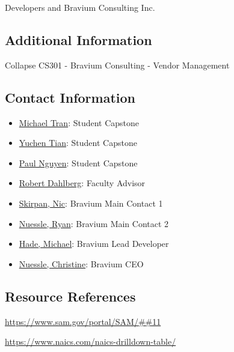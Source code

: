 \documentclass[10pt]{article}
\begin{document}
Developers and Bravium Consulting Inc.

\subsection{Additional Information}

Collapse CS301 - Bravium Consulting - Vendor Management

\subsection{Contact Information}

\begin{itemize}
	\item\href{tranml3@mymail.vcu.edu}{Michael Tran}: Student Capstone 
	\item\href{tiany4@mymail.vcu.edu}{Yuchen Tian}: Student Capstone 
	\item\href{nguyenp22@mymail.vcu.edu}{Paul Nguyen}: Student Capstone 
	\item\href{dahlbergra@mymail.vcu.edu}{Robert Dahlberg}: Faculty Advisor
	\item\href{nskirpan@braviumconsulting.com}{Skirpan, Nic}: Bravium Main Contact 1
	\item\href{rnuessle@braviumconsulting.com}{Nuessle, Ryan}: Bravium Main Contact 2
	\item\href{mhade@braviumconsulting.com}{Hade, Michael}: Bravium Lead Developer
	\item\href{cnuessle@braviumconsulting.com}{Nuessle, Christine}: Bravium CEO

\end{itemize}

\subsection{Resource References}

\begin{Itemize}
	\item \url{https://www.sam.gov/portal/SAM/##11}
	\item \url{https://www.naics.com/naics-drilldown-table/}
\end{Itemize}





\end{document}
